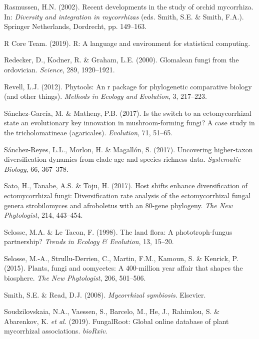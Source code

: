 \documentclass[12pt,]{article}
\begin{document}
\leavevmode\hypertarget{ref-rasmussen_2002}{}%
Rasmussen, H.N. (2002). Recent developments in the study of orchid
mycorrhiza. In: \emph{Diversity and integration in mycorrhizas} (eds.
Smith, S.E. \& Smith, F.A.). Springer Netherlands, Dordrecht, pp.
149--163.

\leavevmode\hypertarget{ref-rcoreteam_software_2019}{}%
R Core Team. (2019). R: A language and environment for statistical
computing.

\leavevmode\hypertarget{ref-redecker_2000}{}%
Redecker, D., Kodner, R. \& Graham, L.E. (2000). Glomalean fungi from
the ordovician. \emph{Science}, 289, 1920--1921.

\leavevmode\hypertarget{ref-revell_2012}{}%
Revell, L.J. (2012). Phytools: An r package for phylogenetic comparative
biology (and other things). \emph{Methods in Ecology and Evolution}, 3,
217--223.

\leavevmode\hypertarget{ref-snchezgarca_2017}{}%
Sánchez-García, M. \& Matheny, P.B. (2017). Is the switch to an
ectomycorrhizal state an evolutionary key innovation in mushroom-forming
fungi? A case study in the tricholomatineae (agaricales).
\emph{Evolution}, 71, 51--65.

\leavevmode\hypertarget{ref-snchezreyes_2017}{}%
Sánchez-Reyes, L.L., Morlon, H. \& Magallón, S. (2017). Uncovering
higher-taxon diversification dynamics from clade age and
species-richness data. \emph{Systematic Biology}, 66, 367--378.

\leavevmode\hypertarget{ref-sato_2017}{}%
Sato, H., Tanabe, A.S. \& Toju, H. (2017). Host shifts enhance
diversification of ectomycorrhizal fungi: Diversification rate analysis
of the ectomycorrhizal fungal genera strobilomyces and afroboletus with
an 80-gene phylogeny. \emph{The New Phytologist}, 214, 443--454.

\leavevmode\hypertarget{ref-selosse_1998}{}%
Selosse, M.A. \& Le Tacon, F. (1998). The land flora: A
phototroph-fungus partnership? \emph{Trends in Ecology \& Evolution},
13, 15--20.

\leavevmode\hypertarget{ref-selosse_2015}{}%
Selosse, M.-A., Strullu-Derrien, C., Martin, F.M., Kamoun, S. \&
Kenrick, P. (2015). Plants, fungi and oomycetes: A 400-million year
affair that shapes the biosphere. \emph{The New Phytologist}, 206,
501--506.

\leavevmode\hypertarget{ref-smith_2008}{}%
Smith, S.E. \& Read, D.J. (2008). \emph{Mycorrhizal symbiosis}.
Elsevier.

\leavevmode\hypertarget{ref-soudzilovskaia_2019}{}%
Soudzilovskaia, N.A., Vaessen, S., Barcelo, M., He, J., Rahimlou, S. \&
Abarenkov, K. \emph{et al.} (2019). FungalRoot: Global online database
of plant mycorrhizal associations. \emph{bioRxiv}.
\end{document}
